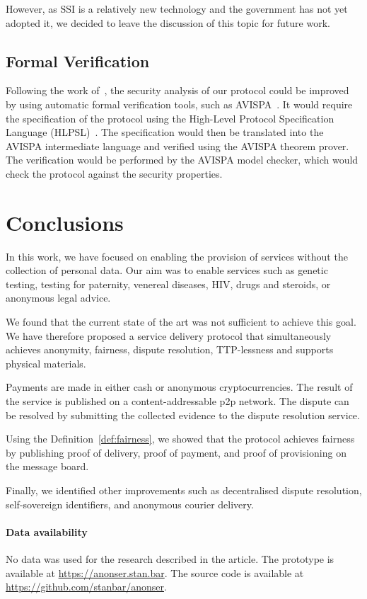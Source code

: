 \documentclass[pdftex,twocolumn,epjc3]{svjour3}
\begin{document}
{However, as SSI is a relatively new technology and the government has not yet adopted it, we decided to leave the discussion of this topic for future work.

\subsection{Formal Verification}\label{sec:formal-verification}
Following the work of~\cite{birjoveanuFormalVerificationMultiparty2022}, the security analysis of our protocol could be improved by using automatic formal verification tools, such as AVISPA~\cite{armandoAVISPAToolAutomated2005}. It would require the specification of the protocol using the High-Level Protocol Specification Language (HLPSL)~\cite{chevalierHighLevelProtocol2004}. The specification would then be translated into the AVISPA intermediate language and verified using the AVISPA theorem prover. The verification would be performed by the AVISPA model checker, which would check the protocol against the security properties.

\section{Conclusions}\label{sec:conclusion}
In this work, we have focused on enabling the provision of services without the collection of personal data. Our aim was to enable services such as genetic testing, testing for paternity, venereal diseases, HIV, drugs and steroids, or anonymous legal advice.

We found that the current state of the art was not sufficient to achieve this goal. We have therefore proposed a service delivery protocol that simultaneously achieves anonymity, fairness, dispute resolution, TTP-lessness and supports physical materials.

Payments are made in either cash or anonymous cryptocurrencies. The result of the service is published on a content-addressable p2p network. The dispute can be resolved by submitting the collected evidence to the dispute resolution service. 

Using the Definition~\ref{def:fairness}, we showed that the protocol achieves fairness by publishing proof of delivery, proof of payment, and proof of provisioning on the message board. 

Finally, we identified other improvements such as decentralised dispute resolution, self-sovereign identifiers, and anonymous courier delivery.

\paragraph{Data availability}
No data was used for the research described in the article.
The prototype is available at \url{https://anonser.stan.bar}. 
The source code is available at \url{https://github.com/stanbar/anonser}.

}
\end{document}
